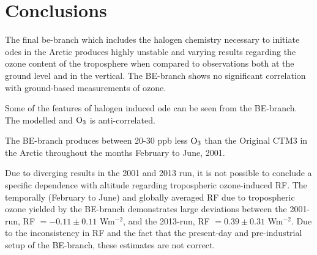 \setcounter{chapter}{7}
\chapter{Conclusions}\label{Chap:conclusion}

The final \acrlong{be}-branch which includes the halogen chemistry necessary to initiate \acrlong{ode}s in the Arctic produces highly unstable and varying results regarding the ozone content of the troposphere when compared to observations both at the ground level and in the vertical. The BE-branch shows no significant correlation with ground-based measurements of ozone. 

\medskip

Some of the features of halogen induced \acrshort{ode} can be seen from the BE-branch. The modelled  and $\mathrm{O_3}$ is anti-correlated. 

\medskip

The BE-branch produces between 20-30 ppb less $\mathrm{O_3}$ than the Original CTM3 in the Arctic throughout the months February to June, 2001. 

\medskip

Due to diverging results in the 2001 and 2013 run, it is not possible to conclude a specific dependence with altitude regarding tropospheric ozone-induced RF. The temporally (February to June) and globally averaged RF due to tropospheric ozone yielded by the BE-branch demonstrates large deviations between the 2001-run, RF $=-0.11\pm0.11$ Wm$^{-2}$, and the 2013-run, RF $= 0.39\pm0.31$ Wm$^{-2}$. Due to the inconsistency in RF and the fact that the present-day and pre-industrial setup of the BE-branch, these estimates are not correct. 